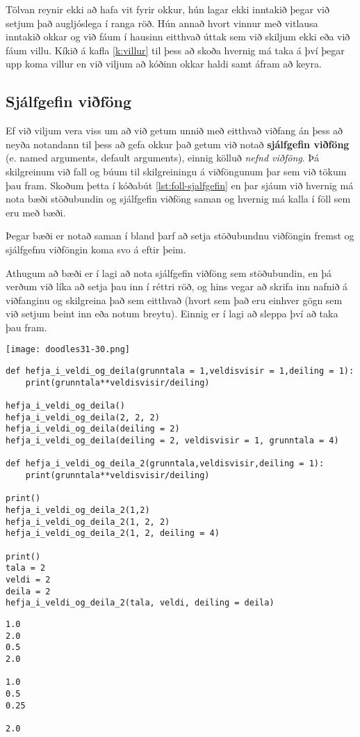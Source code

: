 Tölvan reynir ekki að hafa vit fyrir okkur, hún lagar ekki inntakið þegar við setjum það augljóslega í ranga röð.
Hún annað hvort vinnur með vitlausa inntakið okkar og við fáum í hausinn eitthvað úttak sem við skiljum ekki eða við fáum villu.
Kíkið á kafla \ref{k:villur} til þess að skoða hvernig má taka á því þegar upp koma villur en við viljum að kóðinn okkar haldi samt áfram að keyra.



\subsection{Sjálfgefin viðföng}\label{uk:föll-sjálfgefin}
Ef við viljum vera viss um að við getum unnið með eitthvað viðfang án þess að neyða notandann til þess að gefa okkur það getum við notað \textbf{sjálfgefin viðföng} (e. named arguments, default arguments), einnig kölluð \textit{nefnd viðföng}.
Þá skilgreinum við fall og búum til skilgreiningu á viðföngunum þar sem við tökum þau fram.
Skoðum þetta í kóðabút \ref{lst:foll-sjalfgefin} en þar sjáum við hvernig má nota bæði stöðubundin og sjálfgefin viðföng saman og hvernig má kalla í föll sem eru með bæði.

Þegar bæði er notað saman í bland þarf að setja stöðubundnu viðföngin fremst og sjálfgefnu viðföngin koma svo á eftir þeim.

Athugum að bæði er í lagi að nota sjálfgefin viðföng sem stöðubundin, en þá verðum við líka að setja þau inn í réttri röð, og hins vegar að skrifa inn nafnið á viðfanginu og skilgreina það sem eitthvað (hvort sem það eru einhver gögn sem við setjum beint inn eða notum breytu).
Einnig er í lagi að sleppa því að taka þau fram.

	\begin{center}
		\texttt{[image: doodles31-30.png]}
	\end{center}
\begin{lstlisting}[caption=Sjálfgefin viðföng kynnt, label=lst:foll-sjalfgefin]
def hefja_i_veldi_og_deila(grunntala = 1,veldisvisir = 1,deiling = 1):	
	print(grunntala**veldisvisir/deiling)
	
hefja_i_veldi_og_deila()
hefja_i_veldi_og_deila(2, 2, 2)
hefja_i_veldi_og_deila(deiling = 2)
hefja_i_veldi_og_deila(deiling = 2, veldisvisir = 1, grunntala = 4)

def hefja_i_veldi_og_deila_2(grunntala,veldisvisir,deiling = 1):	
	print(grunntala**veldisvisir/deiling)

print()
hefja_i_veldi_og_deila_2(1,2) 
hefja_i_veldi_og_deila_2(1, 2, 2) 
hefja_i_veldi_og_deila_2(1, 2, deiling = 4) 

print()
tala = 2
veldi = 2
deila = 2
hefja_i_veldi_og_deila_2(tala, veldi, deiling = deila)
\end{lstlisting}
\lstset{style=uttak}
\begin{lstlisting}
1.0
2.0
0.5
2.0

1.0
0.5
0.25

2.0
\end{lstlisting}
\lstset{style=venjulegt}

